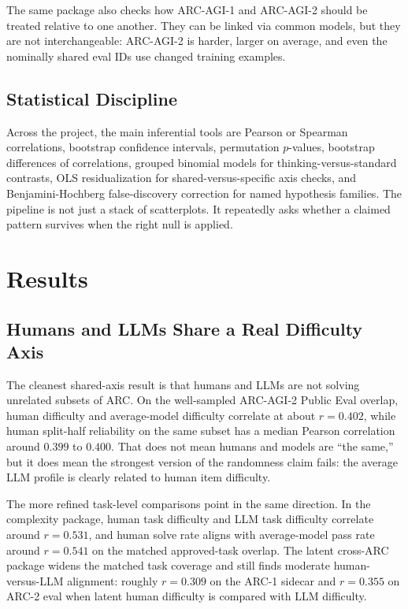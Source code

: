 \documentclass[11pt,letterpaper]{article}
\begin{document}
The same package also checks how ARC-AGI-1 and ARC-AGI-2 should be treated relative to one another. They can be linked via common models, but they are not interchangeable: ARC-AGI-2 is harder, larger on average, and even the nominally shared eval IDs use changed training examples.

\subsection{Statistical Discipline}

Across the project, the main inferential tools are Pearson or Spearman correlations, bootstrap confidence intervals, permutation $p$-values, bootstrap differences of correlations, grouped binomial models for thinking-versus-standard contrasts, OLS residualization for shared-versus-specific axis checks, and Benjamini-Hochberg false-discovery correction for named hypothesis families. The pipeline is not just a stack of scatterplots. It repeatedly asks whether a claimed pattern survives when the right null is applied.

\section{Results}

\subsection{Humans and LLMs Share a Real Difficulty Axis}

The cleanest shared-axis result is that humans and LLMs are not solving unrelated subsets of ARC. On the well-sampled ARC-AGI-2 Public Eval overlap, human difficulty and average-model difficulty correlate at about $r = 0.402$, while human split-half reliability on the same subset has a median Pearson correlation around $0.399$ to $0.400$. That does not mean humans and models are ``the same,'' but it does mean the strongest version of the randomness claim fails: the average LLM profile is clearly related to human item difficulty.

The more refined task-level comparisons point in the same direction. In the complexity package, human task difficulty and LLM task difficulty correlate around $r = 0.531$, and human solve rate aligns with average-model pass rate around $r = 0.541$ on the matched approved-task overlap. The latent cross-ARC package widens the matched task coverage and still finds moderate human-versus-LLM alignment: roughly $r = 0.309$ on the ARC-1 sidecar and $r = 0.355$ on ARC-2 eval when latent human difficulty is compared with LLM difficulty.
\end{document}
